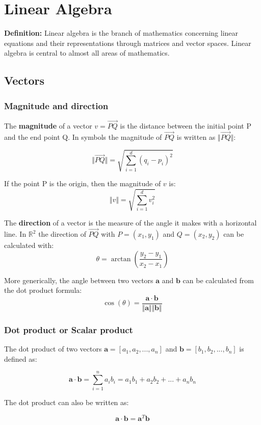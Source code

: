 \chapter{Linear Algebra}
\textbf{Definition:} Linear algebra is the branch of mathematics concerning linear equations and their representations through matrices and vector spaces. Linear algebra is central to almost all areas of mathematics.

\section{Vectors}

\subsection{Magnitude and direction}
The \textbf{magnitude} of a vector $v=\vec{PQ}$ is the distance between the initial point P and the end point Q. In symbols the magnitude of $\vec{PQ}$ is written as $\Vert\vec{PQ}\Vert$:

\[
\Vert \vec{PQ} \Vert = \sqrt{ \sum_{i=1}^{d} (q_i - p_i)^2}
\]


If the point P is the origin, then the magnitude of $v$ is:
\[
\Vert v \Vert = \sqrt{ \sum_{i=1}^{d} v_i^2 }
\]


The \textbf{direction} of a vector is the measure of the angle it makes with a horizontal line.
In $\mathbb{R}^2$ the direction of $\vec{PQ}$ with $P=(x_1,y_1)$ and $Q=(x_2,y_2)$ can be calculated with:
\[
\theta = \arctan \left( \frac{y_2-y_1}{x_2-x_1} \right)
\]

More generically, the angle between two vectors $\mathbf{a}$ and $\mathbf{b}$ can be calculated from the dot product formula:
\[
\cos(\theta) = \frac{ \mathbf{a} \cdot \mathbf{b} }{ \Vert \mathbf{a} \Vert  \Vert \mathbf{b} \Vert }
\]


\subsection{Dot product or Scalar product}
The dot product of two vectors $\mathbf{a} = [a_1, a_2, ..., a_n]$ and $\mathbf{b} = [b_1, b_2, ..., b_n]$ is defined as:

\[
\mathbf{a} \cdot \mathbf{b} = \sum_{i=1}^{n}a_i b_i = a_1 b_1 + a_2 b_2 + ... + a_n b_n
\]

The dot product can also be written as:

\[ \mathbf{a} \cdot \mathbf{b} =\mathbf{a} ^{T}\mathbf {b} \] 


